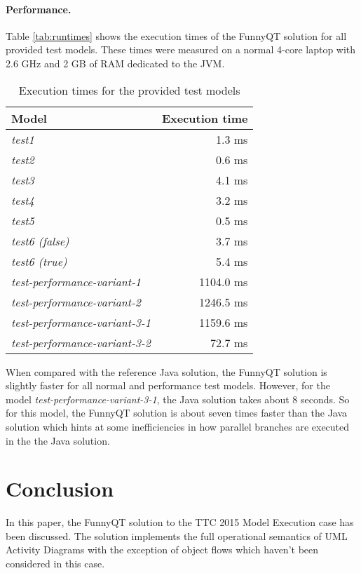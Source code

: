 \documentclass[submission]{eptcs}
\begin{document}
\paragraph{Performance.}

Table \vref{tab:runtimes} shows the execution times of the FunnyQT solution for
all provided test models.  These times were measured on a normal 4-core laptop
with 2.6 GHz and 2 GB of RAM dedicated to the JVM.

\begin{table}[h!tb]
  \centering
  \begin{tabular}{|l | r |}
    \hline
    \textbf{Model} & \textbf{Execution time}\\
    \hline
    \emph{test1} & 1.3 ms\\
    \emph{test2} & 0.6 ms\\
    \emph{test3} & 4.1 ms\\
    \emph{test4} & 3.2 ms\\
    \emph{test5} & 0.5 ms\\
    \emph{test6 (false)} & 3.7 ms\\
    \emph{test6 (true)}  & 5.4 ms\\
    \emph{test-performance-variant-1} & 1104.0 ms\\
    \emph{test-performance-variant-2} & 1246.5 ms\\
    \emph{test-performance-variant-3-1} & 1159.6 ms\\
    \emph{test-performance-variant-3-2} & 72.7 ms\\
    \hline
  \end{tabular}
  \caption{Execution times for the provided test models}
  \label{tab:runtimes}
\end{table}

When compared with the reference Java solution, the FunnyQT solution is
slightly faster for all normal and performance test models.  However, for the
model \emph{test-performance-variant-3-1}, the Java solution takes about 8
seconds.  So for this model, the FunnyQT solution is about seven times faster
than the Java solution which hints at some inefficiencies in how parallel
branches are executed in the the Java solution.


\section{Conclusion}
\label{sec:conclusion}

In this paper, the FunnyQT solution to the TTC 2015 Model Execution case has
been discussed.  The solution implements the full operational semantics of UML
Activity Diagrams with the exception of object flows which haven't been
considered in this case.
\end{document}
